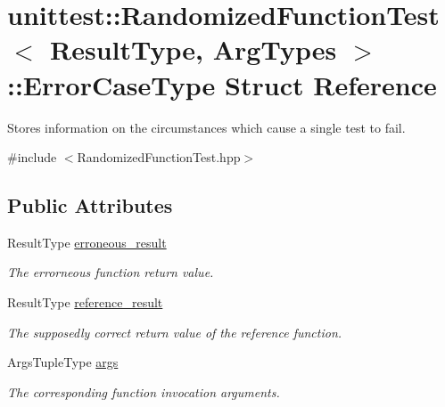 \hypertarget{structunittest_1_1_randomized_function_test_1_1_error_case_type}{}\section{unittest\+:\+:Randomized\+Function\+Test$<$ Result\+Type, Arg\+Types $>$\+:\+:Error\+Case\+Type Struct Reference}
\label{structunittest_1_1_randomized_function_test_1_1_error_case_type}


Stores information on the circumstances which cause a single test to fail.  




{\ttfamily \#include $<$Randomized\+Function\+Test.\+hpp$>$}

\subsection*{Public Attributes}
\begin{DoxyCompactItemize}
\item 
Result\+Type \hyperlink{structunittest_1_1_randomized_function_test_1_1_error_case_type_aac3651b4656294eb6dfa1f8997936685}{erroneous\+\_\+result}\hypertarget{structunittest_1_1_randomized_function_test_1_1_error_case_type_aac3651b4656294eb6dfa1f8997936685}{}\label{structunittest_1_1_randomized_function_test_1_1_error_case_type_aac3651b4656294eb6dfa1f8997936685}

\begin{DoxyCompactList}\small\item\em The errorneous function return value. \end{DoxyCompactList}\item 
Result\+Type \hyperlink{structunittest_1_1_randomized_function_test_1_1_error_case_type_a15a54a6d7304321aae4b838e3d95b57a}{reference\+\_\+result}\hypertarget{structunittest_1_1_randomized_function_test_1_1_error_case_type_a15a54a6d7304321aae4b838e3d95b57a}{}\label{structunittest_1_1_randomized_function_test_1_1_error_case_type_a15a54a6d7304321aae4b838e3d95b57a}

\begin{DoxyCompactList}\small\item\em The supposedly correct return value of the reference function. \end{DoxyCompactList}\item 
Args\+Tuple\+Type \hyperlink{structunittest_1_1_randomized_function_test_1_1_error_case_type_a42a56dc7973866d25db122de90c69173}{args}\hypertarget{structunittest_1_1_randomized_function_test_1_1_error_case_type_a42a56dc7973866d25db122de90c69173}{}\label{structunittest_1_1_randomized_function_test_1_1_error_case_type_a42a56dc7973866d25db122de90c69173}

\begin{DoxyCompactList}\small\item\em The corresponding function invocation arguments. \end{DoxyCompactList}\end{DoxyCompactItemize}


